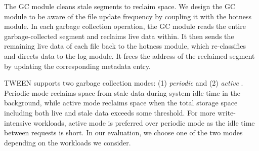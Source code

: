 The GC module cleans stale segments to reclaim space.  We design the GC module
to be aware of the file update frequency by coupling it with the hotness module.
In each garbage collection operation, the GC module reads the entire
garbage-collected segment and reclaims live data within.  It then sends the
remaining live data of each file back to the hotness module, which re-classifies
and directs data to the log module. It frees the address of the reclaimed
segment by updating the corresponding metadata entry.

TWEEN supports two garbage collection modes: (1) \textit{periodic} and (2)
\textit{active} \cite{rosenblum92}.  Periodic mode reclaims space from stale
data during system idle time in the background, while active mode reclaims
space when the total storage space including both live and stale data
exceeds some threshold.  For more write-intensive workloads, active mode is
preferred over periodic mode as the idle time between requests is short.
In our evaluation, we choose one of the two modes depending on the
workloads we consider. 








